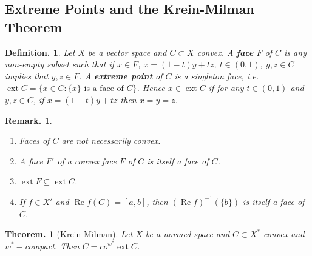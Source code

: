 \documentclass[11pt, a4paper]{memoir}
\theoremstyle{change}
\newtheorem{theorem}{Theorem.}[section]
\theoremstyle{plain}
\theoremstyle{nonumberplain}
\newtheorem{definition}{Definition.}
\newtheorem{remark}{Remark.}
\renewcommand{\Re}{\ensuremath{\operatorname{Re}}}
\DeclareMathOperator{\ext}{ext}
\numberwithin{equation}{section}
\begin{document}
\subsection{Extreme Points and the Krein-Milman Theorem}
\begin{definition}
    Let $X$ be a vector space and $C\subset X$ convex.
    A \textbf{face} $F$ of $C$ is any non-empty subset such that if $x\in F$, $x=(1-t)y+tz$, $t\in(0,1)$, $y,z\in C$ implies that $y,z\in F$.
    A \textbf{extreme point} of $C$ is a singleton face, i.e. $\ext C=\{x\in C:\{x\}\text{ is a face of }C\}$.
    Hence $x\in\ext C$ if for any $t\in(0,1)$ and $y,z\in C$, if $x=(1-t)y+tz$ then $x=y=z$.
\end{definition}
\begin{remark}
    \begin{enumerate}[nl,r]
        \item Faces of $C$ are not necessarily convex.
        \item A face $F'$ of a convex face $F$ of $C$ is itself a face of $C$.
        \item $\ext F\subseteq\ext C$.
        \item If $f\in X'$ and $\Re f(C)=[a,b]$, then $(\Re f)^{-1}(\{b\})$ is itself a face of $C$.
    \end{enumerate}
\end{remark}
\begin{theorem}[Krein-Milman]
    Let $X$ be a normed space and $C\subset X^*$ convex and $w^*-$compact.
    Then $C=\overline{co}^{w^*}\ext C$.
\end{theorem}
\end{document}

